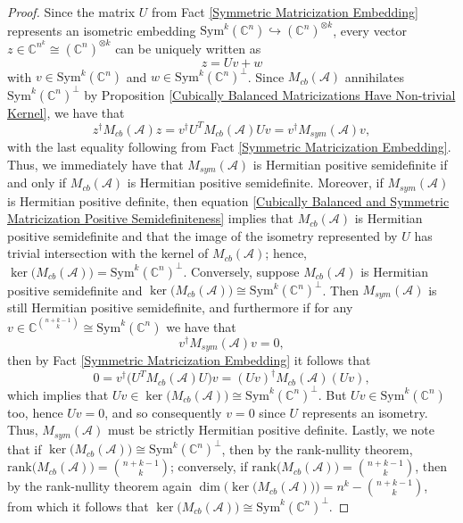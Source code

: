 \documentclass[11pt]{article}
\begin{document}
\begin{proof}
    Since the matrix $U$ from Fact \ref{Symmetric Matricization Embedding} represents an isometric embedding $\mathrm{Sym}^k(\mathbb{C}^n)\hookrightarrow(\mathbb{C}^{n})^{\otimes k}$, every vector $z\in \mathbb{C}^{n^k}\cong (\mathbb{C}^n)^{\otimes k}$ can be uniquely written as 
    \[z = Uv+w\]
    with $v\in \mathrm{Sym}^k(\mathbb{C}^n)$ and $w\in \mathrm{Sym}^k(\mathbb{C}^n)^{\perp}$. Since $M_{cb}(\mathcal{A})$ annihilates $\mathrm{Sym}^k(\mathbb{C}^n)^{\perp}$ by Proposition \ref{Cubically Balanced Matricizations Have Non-trivial Kernel}, we have that 
    \begin{equation}\label{Cubically Balanced and Symmetric Matricization Positive Semidefiniteness}
        z^{\dagger}M_{cb}(\mathcal{A})z = v^{\dagger}U^TM_{cb}(\mathcal{A})Uv = v^{\dagger}M_{sym}(\mathcal{A})v,
    \end{equation}
    with the last equality following from Fact \ref{Symmetric Matricization Embedding}. Thus, we immediately have that $M_{sym}(\mathcal{A})$ is Hermitian positive semidefinite if and only if $M_{cb}(\mathcal{A})$ is Hermitian positive semidefinite. Moreover, if $M_{sym}(\mathcal{A})$ is Hermitian positive definite, then equation \eqref{Cubically Balanced and Symmetric Matricization Positive Semidefiniteness} implies that $M_{cb}(\mathcal{A})$ is Hermitian positive semidefinite and that the image of the isometry represented by $U$ has trivial intersection with the kernel of $M_{cb}(\mathcal{A})$; hence, $\ker\big(M_{cb}(\mathcal{A})\big) = \mathrm{Sym}^k(\mathbb{C}^n)^{\perp}$. Conversely, suppose $M_{cb}(\mathcal{A})$ is Hermitian positive semidefinite and $\ker\big(M_{cb}(\mathcal{A})\big) \cong \mathrm{Sym}^k(\mathbb{C}^n)^{\perp}$. Then $M_{sym}(\mathcal{A})$ is still Hermitian positive semidefinite, and furthermore if for any $v\in \mathbb{C}^{\binom{n+k-1}{k}}\cong \mathrm{Sym}^k(\mathbb{C}^n)$ we have that 
    \[v^{\dagger}M_{sym}(\mathcal{A})v = 0,\]
    then by Fact \ref{Symmetric Matricization Embedding} it follows that 
    \[0 = v^{\dagger}\big(U^TM_{cb}(\mathcal{A})U\big)v = (Uv)^{\dagger}M_{cb}(\mathcal{A})(Uv),\]
    which implies that $Uv\in \ker\big(M_{cb}(\mathcal{A})\big)\cong \mathrm{Sym}^k(\mathbb{C}^n)^{\perp}$. But $Uv\in \mathrm{Sym}^k(\mathbb{C}^n)$ too, hence $Uv = 0$, and so consequently $v=0$ since $U$ represents an isometry. Thus, $M_{sym}(\mathcal{A})$ must be strictly Hermitian positive definite. Lastly, we note that if $\ker\big(M_{cb}(\mathcal{A})\big) \cong \mathrm{Sym}^k(\mathbb{C}^n)^{\perp}$, then by the rank-nullity theorem, $\mathrm{rank}\big(M_{cb}(\mathcal{A})\big) = \binom{n+k-1}{k}$; conversely, if $\mathrm{rank}\big(M_{cb}(\mathcal{A})\big) = \binom{n+k-1}{k}$, then by the rank-nullity theorem again $\dim\Big(\ker\big(M_{cb}(\mathcal{A})\big)\Big) = n^k-\binom{n+k-1}{k}$, from which it follows that $\ker\big(M_{cb}(\mathcal{A})\big) \cong \mathrm{Sym}^k(\mathbb{C}^n)^{\perp}$. 
\end{proof}
\end{document}
